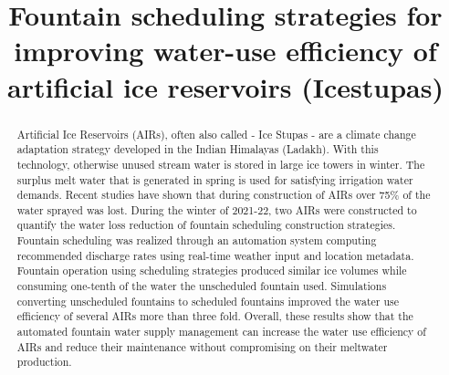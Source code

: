 \documentclass[tc, manuscript]{copernicus}
\begin{document}
\title{Fountain scheduling strategies for improving water-use efficiency of artificial ice reservoirs (Icestupas)}

\def\Authors{Suryanarayanan Balasubramanian\,$^{1,2}$, Martin Hoelzle\,$^{1}$Roger Waser\,$^{3}$}

\def\Address{$^{1}$University of Fribourg, Department of Geosciences, Fribourg, Switzerland $^{2}$University of
Applied Sciences and Arts, Luzern, Switzerland} \def\corrAuthor{Suryanarayanan Balasubramanian}





\maketitle

\begin{abstract}

  Artificial Ice Reservoirs (AIRs), often also called - Ice Stupas - are a climate change adaptation strategy
  developed in the Indian Himalayas (Ladakh). With this technology, otherwise unused stream water is stored in
  large ice towers in winter. The surplus melt water that is generated in spring is used for satisfying
  irrigation water demands. Recent studies have shown that during construction of AIRs over 75\% of the water
  sprayed was lost. During the winter of 2021-22, two AIRs were constructed to quantify the water loss reduction
  of fountain scheduling construction strategies. Fountain scheduling was realized through an automation system
  computing recommended discharge rates using real-time weather input and location metadata. Fountain operation
  using scheduling strategies produced similar ice volumes while consuming one-tenth of the water the
  unscheduled fountain used. Simulations converting unscheduled fountains to scheduled fountains improved the
  water use efficiency of several AIRs more than three fold. Overall, these results show that the automated
  fountain water supply management can increase the water use efficiency of AIRs and reduce their maintenance
  without compromising on their meltwater production.

\end{abstract}
\end{document}
